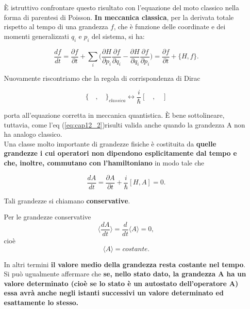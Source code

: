 \documentclass[a4paper,12pt,oneside]{book}
\begin{document}
È istruttivo confrontare questo risultato con l'equazione del moto classico nella forma di parentesi di Poisson. \textbf{In meccanica classica}, per la derivata totale rispetto al tempo di una grandezza $f$, che è funzione delle coordinate e dei momenti generalizzati $q_i$ e $p_i$ del sistema, si ha:

 \begin{equation}
\frac{df}{dt}= \frac{\partial f}{\partial{t}} + \sum_{i}^{}{(\frac{\partial H}{\partial{p_i}}\frac{\partial f}{\partial{q_i}} - \frac{\partial H}{\partial{q_i}}\frac{\partial f}{\partial{p_i}}} )=
\frac{\partial f}{\partial{t}}+ \{H,f\}.
\end{equation}

Nuovamente riscontriamo che la regola di corrispondenza di Dirac 

\begin{equation}
\{ \quad,\quad   \}_{classica}  \leftrightarrow \frac{i}{\hbar} [ \quad, \quad]
\end{equation}

porta all'equazione corretta in meccanica quantistica.
È bene sottolineare, tuttavia, come l'eq (\ref{eq:cap12_2})risulti valida anche quando la grandezza A non ha analogo classico.\\
Una classe molto importante di grandezze fisiche è costituita da \textbf{quelle grandezze i cui operatori non dipendono esplicitamente dal tempo e che, inoltre, commutano con l'hamiltoniano} in modo tale che 

\begin{equation}
\frac{dA}{dt}= \frac{\partial A}{\partial{t}} + \frac{i}{\hbar}[H,A]=0.
\end{equation}

Tali grandezze si chiamano \textbf{conservative}.

Per le grandezze conservative 
\begin{equation} 
\langle \frac{dA}{dt}\rangle= \frac{d}{dt}\langle A \rangle =0,
\end{equation}
cioè 
\begin{equation}
\langle A \rangle= costante.
\end{equation}

In altri termini \textbf{il valore medio della grandezza resta costante nel tempo}. Si può ugualmente affermare che \textbf{se, nello stato dato, la grandezza A ha un valore determinato (cioè se lo stato è un autostato dell'operatore A) essa avrà anche negli istanti successivi un valore determinato ed esattamente lo stesso.}
\end{document}
